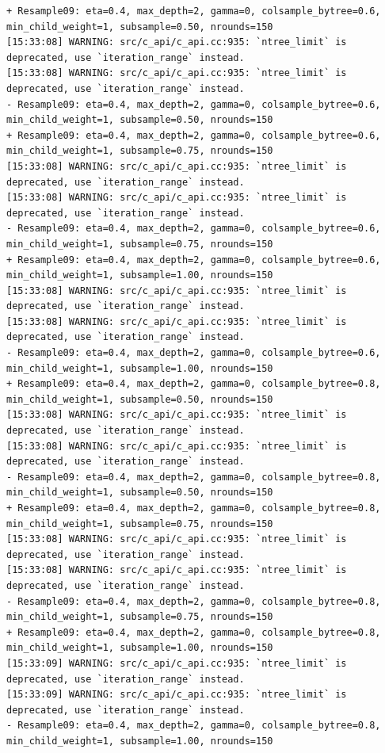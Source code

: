 \documentclass[
  letterpaper,
  DIV=11,
  numbers=noendperiod]{scrartcl}
\begin{document}
\begin{verbatim}
+ Resample09: eta=0.4, max_depth=2, gamma=0, colsample_bytree=0.6, min_child_weight=1, subsample=0.50, nrounds=150 
[15:33:08] WARNING: src/c_api/c_api.cc:935: `ntree_limit` is deprecated, use `iteration_range` instead.
[15:33:08] WARNING: src/c_api/c_api.cc:935: `ntree_limit` is deprecated, use `iteration_range` instead.
- Resample09: eta=0.4, max_depth=2, gamma=0, colsample_bytree=0.6, min_child_weight=1, subsample=0.50, nrounds=150 
+ Resample09: eta=0.4, max_depth=2, gamma=0, colsample_bytree=0.6, min_child_weight=1, subsample=0.75, nrounds=150 
[15:33:08] WARNING: src/c_api/c_api.cc:935: `ntree_limit` is deprecated, use `iteration_range` instead.
[15:33:08] WARNING: src/c_api/c_api.cc:935: `ntree_limit` is deprecated, use `iteration_range` instead.
- Resample09: eta=0.4, max_depth=2, gamma=0, colsample_bytree=0.6, min_child_weight=1, subsample=0.75, nrounds=150 
+ Resample09: eta=0.4, max_depth=2, gamma=0, colsample_bytree=0.6, min_child_weight=1, subsample=1.00, nrounds=150 
[15:33:08] WARNING: src/c_api/c_api.cc:935: `ntree_limit` is deprecated, use `iteration_range` instead.
[15:33:08] WARNING: src/c_api/c_api.cc:935: `ntree_limit` is deprecated, use `iteration_range` instead.
- Resample09: eta=0.4, max_depth=2, gamma=0, colsample_bytree=0.6, min_child_weight=1, subsample=1.00, nrounds=150 
+ Resample09: eta=0.4, max_depth=2, gamma=0, colsample_bytree=0.8, min_child_weight=1, subsample=0.50, nrounds=150 
[15:33:08] WARNING: src/c_api/c_api.cc:935: `ntree_limit` is deprecated, use `iteration_range` instead.
[15:33:08] WARNING: src/c_api/c_api.cc:935: `ntree_limit` is deprecated, use `iteration_range` instead.
- Resample09: eta=0.4, max_depth=2, gamma=0, colsample_bytree=0.8, min_child_weight=1, subsample=0.50, nrounds=150 
+ Resample09: eta=0.4, max_depth=2, gamma=0, colsample_bytree=0.8, min_child_weight=1, subsample=0.75, nrounds=150 
[15:33:08] WARNING: src/c_api/c_api.cc:935: `ntree_limit` is deprecated, use `iteration_range` instead.
[15:33:08] WARNING: src/c_api/c_api.cc:935: `ntree_limit` is deprecated, use `iteration_range` instead.
- Resample09: eta=0.4, max_depth=2, gamma=0, colsample_bytree=0.8, min_child_weight=1, subsample=0.75, nrounds=150 
+ Resample09: eta=0.4, max_depth=2, gamma=0, colsample_bytree=0.8, min_child_weight=1, subsample=1.00, nrounds=150 
[15:33:09] WARNING: src/c_api/c_api.cc:935: `ntree_limit` is deprecated, use `iteration_range` instead.
[15:33:09] WARNING: src/c_api/c_api.cc:935: `ntree_limit` is deprecated, use `iteration_range` instead.
- Resample09: eta=0.4, max_depth=2, gamma=0, colsample_bytree=0.8, min_child_weight=1, subsample=1.00, nrounds=150 

\end{verbatim}
\end{document}
